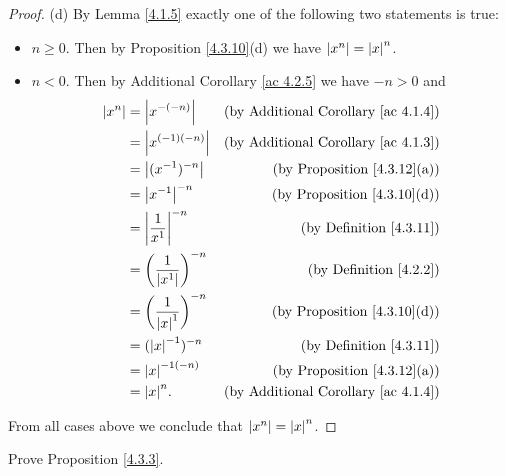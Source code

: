 \begin{proof}{(d)}
    By Lemma \ref{4.1.5} exactly one of the following two statements is true:
    \begin{itemize}
        \item \(n \geq 0\).
              Then by Proposition \ref{4.3.10}(d) we have \(\left\lvert x^n\right\rvert = \left\lvert x\right\rvert^n\).
        \item \(n < 0\).
              Then by Additional Corollary \ref{ac 4.2.5} we have \(-n > 0\) and
              \begin{align*}
                  \abs{x^n} & = \abs{x^{-(-n)}}                      & \text{(by Additional Corollary \ref{ac 4.1.4})} \\
                            & = \abs{x^{(-1)(-n)}}                   & \text{(by Additional Corollary \ref{ac 4.1.3})} \\
                            & = \abs{(x^{-1})^{-n}}                  & \text{(by Proposition \ref{4.3.12}(a))}         \\
                            & = \abs{x^{-1}}^{-n}                    & \text{(by Proposition \ref{4.3.10}(d))}         \\
                            & = \abs{\frac{1}{x^1}}^{-n}             & \text{(by Definition \ref{4.3.11})}             \\
                            & = \bigg(\frac{1}{\abs{x^1}}\bigg)^{-n} & \text{(by Definition \ref{4.2.2})}              \\
                            & = \bigg(\frac{1}{\abs{x}^1}\bigg)^{-n} & \text{(by Proposition \ref{4.3.10}(d))}         \\
                            & = (\abs{x}^{-1})^{-n}                  & \text{(by Definition \ref{4.3.11})}             \\
                            & = \abs{x}^{-1(-n)}                     & \text{(by Proposition \ref{4.3.12}(a))}         \\
                            & = \abs{x}^n.                           & \text{(by Additional Corollary \ref{ac 4.1.4})}
              \end{align*}
    \end{itemize}
    From all cases above we conclude that \(\left\lvert x^n\right\rvert = \left\lvert x\right\rvert^n\).
\end{proof}

\exercisesection

\begin{exercise}\label{ex 4.3.1}
    Prove Proposition \ref{4.3.3}.
\end{exercise}

